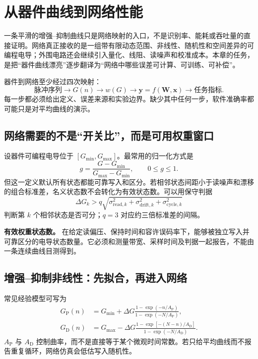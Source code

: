 \documentclass[11pt,a4paper,openany,fontset=fandol]{ctexbook}
\begin{document}
\chapter{从器件曲线到网络性能}

一条平滑的增强--抑制曲线只是网络映射的入口，不是识别率、能耗或吞吐量的直接证明。网络真正接收的是一组带有限动态范围、非线性、随机性和空间差异的可编程电导；外围电路还会继续引入量化、线阻、读噪声和校准成本。本章的任务，是把“器件曲线漂亮”逐步翻译为“网络中哪些误差可计算、可训练、可补偿”。

\begin{mainline}
器件到网络至少经过四次映射：
\[
\text{脉冲序列}\rightarrow G(n)\rightarrow w(G)\rightarrow \mathbf y=f(\mathbf W,\mathbf x)\rightarrow \text{任务指标}.
\]
每一步都必须给出定义、误差来源和实验边界。缺少其中任何一步，软件准确率都可能只是对平均曲线的演示。
\end{mainline}

\section{网络需要的不是“开关比”，而是可用权重窗口}

设器件可编程电导位于 $[G_{\min},G_{\max}]$。最常用的归一化方式是
\[
 g=\frac{G-G_{\min}}{G_{\max}-G_{\min}},\qquad 0\le g\le 1.
\]
但这一定义默认所有状态都能可靠写入和区分。若相邻状态间距小于读噪声和漂移的组合标准差，名义状态数不会转化为有效状态数。可以用保守判据
\[
\Delta G_k > q\sqrt{\sigma_{\mathrm{read},k}^2+\sigma_{\mathrm{drift},k}^2+\sigma_{\mathrm{cycle},k}^2}
\]
判断第 $k$ 个相邻状态是否可分；$q=3$ 对应约三倍标准差的间隔。

\begin{definitionbox}
\textbf{有效权重状态数。} 在给定读偏压、保持时间和容许误码率下，能够被独立写入并可靠区分的电导状态数量。它必须和测量带宽、采样时间及判据一起报告，不能由一条连续曲线目测得到。
\end{definitionbox}

\section{增强--抑制非线性：先拟合，再进入网络}

常见经验模型可写为
\begin{align*}
G_{\mathrm P}(n)&=G_{\min}+\Delta G\frac{1-\exp(-n/A_{\mathrm P})}{1-\exp(-N/A_{\mathrm P})},\\
G_{\mathrm D}(n)&=G_{\max}-\Delta G\frac{1-\exp[-(N-n)/A_{\mathrm D}]}{1-\exp(-N/A_{\mathrm D})}.
\end{align*}
$A_{\mathrm P}$ 与 $A_{\mathrm D}$ 控制曲率，而不是直接等于某个微观时间常数。若只给平均曲线而不报告重复循环，网络仿真会低估写入随机性。
\end{document}
